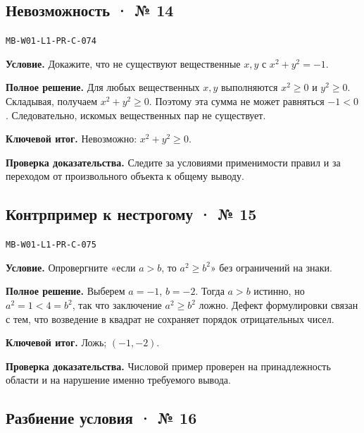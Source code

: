 \documentclass[11pt,a4paper,openany]{book}
\newcommand{\muid}[1]{\texttt{\footnotesize #1}}
\begin{document}
\subsection*{Невозможность · № 14}\hypertarget{solution:MB-W01-L1-PR-C-074}{}

\muid{MB-W01-L1-PR-C-074}\par

\textbf{Условие.} Докажите, что не существуют вещественные $x,y$ с $x^2+y^2=-1$.\par

\textbf{Полное решение.} Для любых вещественных $x,y$ выполняются $x^2\ge0$ и $y^2\ge0$. Складывая, получаем $x^2+y^2\ge0$. Поэтому эта сумма не может равняться $-1<0$. Следовательно, искомых вещественных пар не существует.


\begin{learnbox}\textbf{Ключевой итог.} Невозможно: $x^2+y^2\ge0$.\par \textbf{Проверка доказательства.} 
Следите за условиями применимости правил и за переходом от произвольного объекта к общему выводу. 
\end{learnbox}

\subsection*{Контрпример к нестрогому · № 15}\hypertarget{solution:MB-W01-L1-PR-C-075}{}

\muid{MB-W01-L1-PR-C-075}\par

\textbf{Условие.} Опровергните «если $a>b$, то $a^2\ge b^2$» без ограничений на знаки.\par

\textbf{Полное решение.} Выберем $a=-1$, $b=-2$. Тогда $a>b$ истинно, но $a^2=1<4=b^2$, так что заключение $a^2\ge b^2$ ложно. Дефект формулировки связан с тем, что возведение в квадрат не сохраняет порядок отрицательных чисел.


\begin{learnbox}\textbf{Ключевой итог.} Ложь; $(-1,-2)$.\par \textbf{Проверка доказательства.} 
Числовой пример проверен на принадлежность области и на нарушение именно требуемого вывода. 
\end{learnbox}

\subsection*{Разбиение условия · № 16}\hypertarget{solution:MB-W01-L1-PR-C-076}{}
\end{document}
